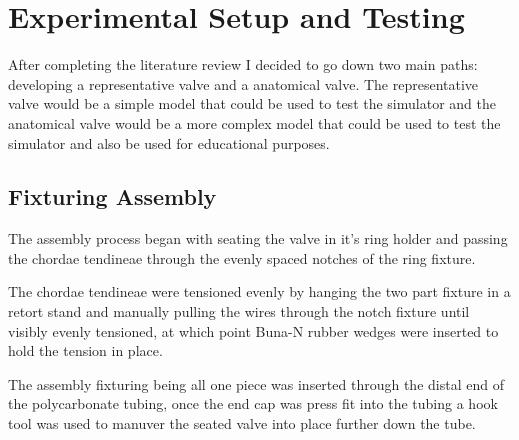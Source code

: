 \chapter{Experimental Setup and Testing}\label{ch:testing}
\vspace{-2.5em}

\mynewline
After completing the literature review I decided to go down two main paths: developing a representative valve and a anatomical valve. The representative valve would be a simple model that could be used to test the simulator and the anatomical valve would be a more complex model that could be used to test the simulator and also be used for educational purposes.

\section{Fixturing Assembly}
The assembly process began with seating the valve in it's ring holder and passing the chordae tendineae through the evenly spaced notches of the ring fixture.

The chordae tendineae were tensioned evenly by hanging the two part fixture in a retort stand and manually pulling the wires through the notch fixture until visibly evenly tensioned, at which point Buna-N rubber wedges were inserted to hold the tension in place.

The assembly fixturing being all one piece was inserted through the distal end of the polycarbonate tubing, once the end cap was press fit into the tubing a hook tool was used to manuver the seated valve into place further down the tube.


